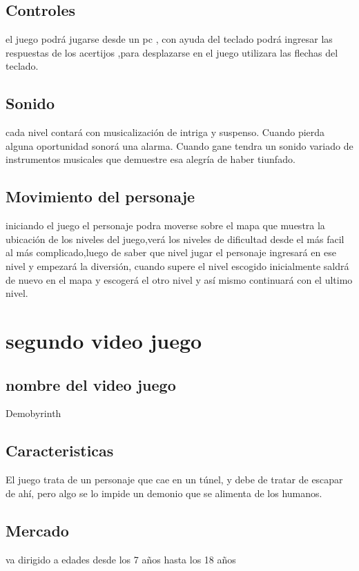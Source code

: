 \documentclass{article}
\begin{document}
\subsection{Controles}
%
el juego podrá jugarse desde un pc , con ayuda del teclado podrá ingresar las respuestas de los acertijos ,para desplazarse en el juego utilizara las flechas del teclado.

\subsection{Sonido}
%
cada nivel contará con musicalización de intriga y suspenso.
Cuando pierda alguna oportunidad sonorá una alarma.
Cuando gane tendra un sonido variado de instrumentos musicales que demuestre esa alegría de haber tiunfado.

\subsection{Movimiento del personaje}
%
iniciando el juego el personaje podra moverse sobre el mapa que muestra la ubicación de los niveles del juego,verá los niveles de dificultad desde el más facil al más complicado,luego de saber que nivel jugar el personaje ingresará en ese nivel y empezará la diversión, cuando supere el nivel escogido inicialmente saldrá de nuevo en el mapa y escogerá el otro nivel y así mismo continuará con el ultimo nivel.

\section{segundo video juego}\label{intro}


\subsection{nombre del video juego}
Demobyrinth


\subsection{Caracteristicas}
%
El juego trata de un personaje que cae en un túnel, y debe de tratar de escapar de ahí, pero algo se lo impide un demonio que se alimenta de los humanos.

\subsection{Mercado}
%
va dirigido a edades desde los 7 años hasta los 18 años
\end{document}

